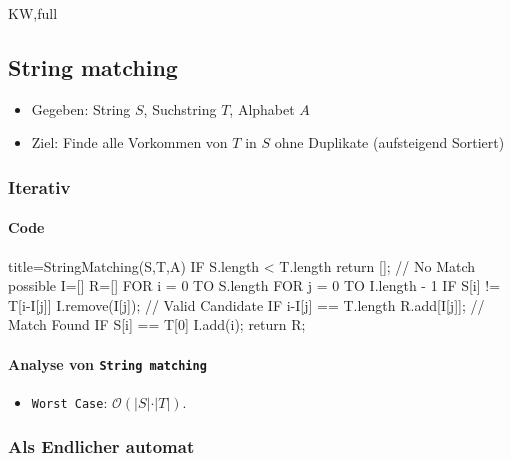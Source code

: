 \documentclass[
    ngerman,
    color=3b,
    dark_mode,
    load_common, %
    summary,
    boxarc,
]{rubos-tuda-template}
\begin{document}
\begin{taggedblock}{KW,full}
    \subsection{String matching}\label{StringMatching}
    \begin{idea}\mbox{}
        \begin{itemize}
            \item Gegeben: String $S$, Suchstring $T$, Alphabet $A$
            \item Ziel: Finde alle Vorkommen von $T$ in $S$ ohne Duplikate (aufsteigend Sortiert)
        \end{itemize}
    \end{idea}

\subsubsection{Iterativ}
    \paragraph{Code}\mbox{}

\begin{codeBlock}[autogobble]{title={StringMatching(S,T,A)}}
    IF S.length < T.length
        return [];                // No Match possible
    I=[]
    R=[]
    FOR i = 0 TO S.length
        FOR j = 0 TO I.length - 1
            IF S[i] != T[i-I[j]]
                I.remove(I[j]);   // Valid Candidate
            IF i-I[j] == T.length
                R.add[I[j]];      // Match Found
        IF S[i] == T[0]
            I.add(i);
    return R;

\end{codeBlock}
\paragraph{Analyse von \texttt{String matching}}
\begin{description}[leftmargin=5cm,itemsep=1em]
    \item [Komplexität]
          \begin{itemize}
              \item \texttt{Worst Case}: $\mathcal{O}(\vert S\vert\cdot\vert T\vert)$.
          \end{itemize}
\end{description}
\subsubsection{Als Endlicher automat}\label{BOFAStringMatching}
\begin{figure}[h]
    \centering
    
\end{figure}
\clearpage
\end{taggedblock}
%
\end{document}
